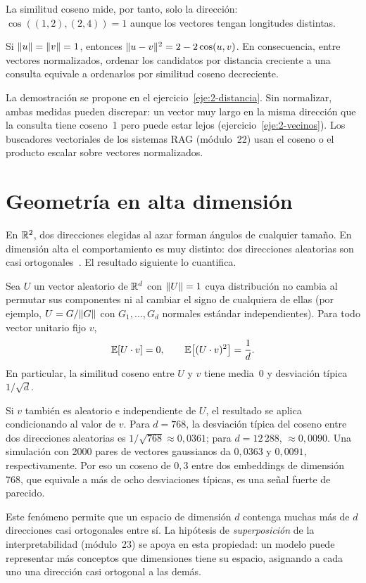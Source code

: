 La similitud coseno mide, por tanto, solo la dirección: $\cos((1,2),(2,4))=1$ aunque los vectores tengan longitudes distintas.

\addtocounter{definicion}{1}%

\begin{proposicion}\label{prop:coseno-distancia}
Si $\lVert u\rVert=\lVert v\rVert=1$, entonces $\lVert u-v\rVert^{2}=2-2\cos(u,v)$. En consecuencia, entre vectores normalizados, ordenar los candidatos por distancia creciente a una consulta equivale a ordenarlos por similitud coseno decreciente.
\end{proposicion}

La demostración se propone en el ejercicio~\ref{eje:2-distancia}. Sin normalizar, ambas medidas pueden discrepar: un vector muy largo en la misma dirección que la consulta tiene coseno~1 pero puede estar lejos (ejercicio~\ref{eje:2-vecinos}). Los buscadores vectoriales de los sistemas RAG (módulo~22) usan el coseno o el producto escalar sobre vectores normalizados.

\section{Geometría en alta dimensión}

En $\mathbb{R}^{2}$, dos direcciones elegidas al azar forman ángulos de cualquier tamaño. En dimensión alta el comportamiento es muy distinto: dos direcciones aleatorias son casi ortogonales~\cite[§2.4.2]{bhk}. El resultado siguiente lo cuantifica.

\begin{proposicion}\label{prop:alta-dim}
Sea $U$ un vector aleatorio de $\mathbb{R}^{d}$ con $\lVert U\rVert=1$ cuya distribución no cambia al permutar sus componentes ni al cambiar el signo de cualquiera de ellas (por ejemplo, $U=G/\lVert G\rVert$ con $G_1,\dots,G_d$ normales estándar independientes). Para todo vector unitario fijo $v$,
\[
\mathbb{E}[U\cdot v]=0,\qquad \mathbb{E}\bigl[(U\cdot v)^{2}\bigr]=\frac1d .
\]
En particular, la similitud coseno entre $U$ y $v$ tiene media~0 y desviación típica $1/\sqrt d$.
\end{proposicion}

Si $v$ también es aleatorio e independiente de $U$, el resultado se aplica condicionando al valor de $v$. Para $d=768$, la desviación típica del coseno entre dos direcciones aleatorias es $1/\sqrt{768}\approx 0{,}0361$; para $d=12\,288$, $\approx 0{,}0090$. Una simulación con 2000 pares de vectores gaussianos da $0{,}0363$ y $0{,}0091$, respectivamente. Por eso un coseno de $0{,}3$ entre dos embeddings de dimensión 768, que equivale a más de ocho desviaciones típicas, es una señal fuerte de parecido.

\begin{observacion}
Este fenómeno permite que un espacio de dimensión $d$ contenga muchas más de $d$ direcciones casi ortogonales entre sí. La hipótesis de \emph{superposición} de la interpretabilidad (módulo~23) se apoya en esta propiedad: un modelo puede representar más conceptos que dimensiones tiene su espacio, asignando a cada uno una dirección casi ortogonal a las demás.
\end{observacion}

